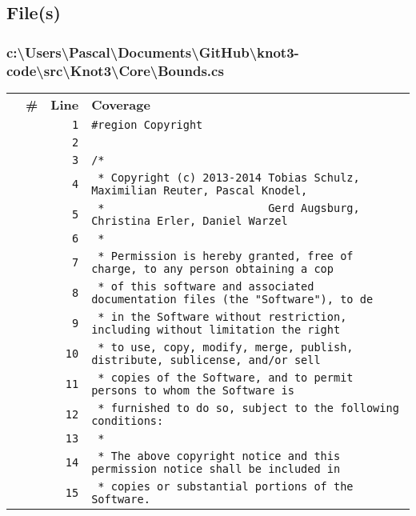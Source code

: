 \documentclass[a4paper,10pt]{article}
\begin{document}
\subsection{File(s)}
\subsubsection{c:\textbackslash Users\textbackslash Pascal\textbackslash Documents\textbackslash GitHub\textbackslash knot3-code\textbackslash src\textbackslash Knot3\textbackslash Core\textbackslash Bounds.cs}
\begin{longtable}[l]{lrrl}
\textbf{} & \textbf{\#} & \textbf{Line} & \textbf{Coverage}\\
\cellcolor{gray} &  & \verb~1~ & \verb~#region Copyright~\\
\cellcolor{gray} &  & \verb~2~ & \verb~~\\
\cellcolor{gray} &  & \verb~3~ & \verb~/*~\\
\cellcolor{gray} &  & \verb~4~ & \verb~ * Copyright (c) 2013-2014 Tobias Schulz, Maximilian Reuter, Pascal Knodel,~\\
\cellcolor{gray} &  & \verb~5~ & \verb~ *                         Gerd Augsburg, Christina Erler, Daniel Warzel~\\
\cellcolor{gray} &  & \verb~6~ & \verb~ *~\\
\cellcolor{gray} &  & \verb~7~ & \verb~ * Permission is hereby granted, free of charge, to any person obtaining a cop~\\
\cellcolor{gray} &  & \verb~8~ & \verb~ * of this software and associated documentation files (the "Software"), to de~\\
\cellcolor{gray} &  & \verb~9~ & \verb~ * in the Software without restriction, including without limitation the right~\\
\cellcolor{gray} &  & \verb~10~ & \verb~ * to use, copy, modify, merge, publish, distribute, sublicense, and/or sell~\\
\cellcolor{gray} &  & \verb~11~ & \verb~ * copies of the Software, and to permit persons to whom the Software is~\\
\cellcolor{gray} &  & \verb~12~ & \verb~ * furnished to do so, subject to the following conditions:~\\
\cellcolor{gray} &  & \verb~13~ & \verb~ *~\\
\cellcolor{gray} &  & \verb~14~ & \verb~ * The above copyright notice and this permission notice shall be included in ~\\
\cellcolor{gray} &  & \verb~15~ & \verb~ * copies or substantial portions of the Software.~\\

\end{longtable}
\end{document}
